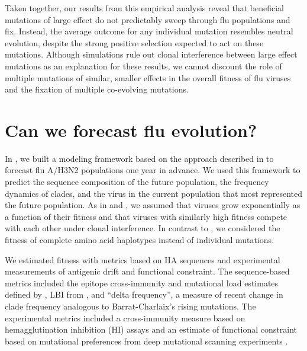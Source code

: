 Taken together, our results from this empirical analysis reveal that beneficial mutations of large effect do not predictably sweep through flu populations and fix.
Instead, the average outcome for any individual mutation resembles neutral evolution, despite the strong positive selection expected to act on these mutations.
Although simulations rule out clonal interference between large effect mutations as an explanation for these results, we cannot discount the role of multiple mutations of similar, smaller effects in the overall fitness of flu viruses and the fixation of multiple co-evolving mutations.

\section{Can we forecast flu evolution?}

In \citet{Huddleston2020}, we built a modeling framework based on the approach described in \citet{Luksza:2014hj} to forecast flu A/H3N2 populations one year in advance.
We used this framework to predict the sequence composition of the future population, the frequency dynamics of clades, and the virus in the current population that most represented the future population.
As in \citet{Barrat-Charlaix2020} and \citet{Luksza:2014hj}, we assumed that viruses grow exponentially as a function of their fitness and that viruses with similarly high fitness compete with each other under clonal interference.
In contrast to \citet{Barrat-Charlaix2020}, we considered the fitness of complete amino acid haplotypes instead of individual mutations.

We estimated fitness with metrics based on HA sequences and experimental measurements of antigenic drift and functional constraint.
The sequence-based metrics included the epitope cross-immunity and mutational load estimates defined by \citet{Luksza:2014hj}, LBI from \citet{Neher:2014eu}, and ``delta frequency'', a measure of recent change in clade frequency analogous to Barrat-Charlaix's rising mutations.
The experimental metrics included a cross-immunity measure based on hemagglutination inhibition (HI) assays \citep{Neher:2016hy} and an estimate of functional constraint based on mutational preferences from deep mutational scanning experiments \citep{Lee2018}.


